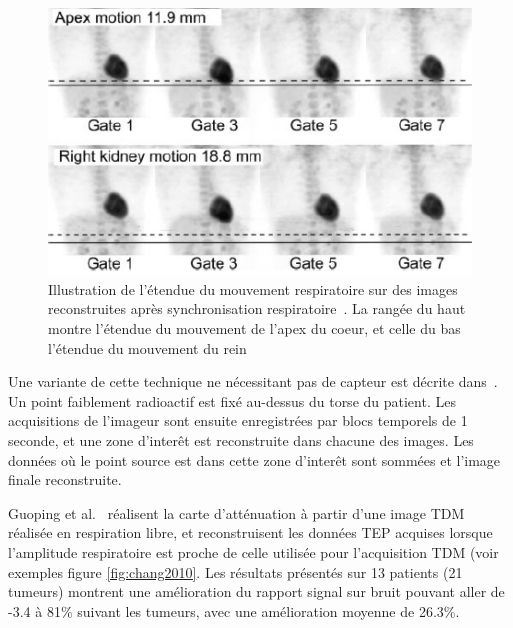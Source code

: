 \begin{figure}[h!]
	\begin{center}
		\includegraphics[width=12cm]{images/gatingBoucher2004}
	\end{center}
	\caption{Illustration de l'étendue du mouvement respiratoire sur des images reconstruites après synchronisation respiratoire~\cite{boucher2004respiratory}. La rangée du haut montre l'étendue du mouvement de l'apex du coeur, et celle du bas l'étendue du mouvement du rein} 
	\label{fig:boucher2004}
\end{figure}

Une variante de cette technique ne nécessitant pas de capteur est décrite dans~\cite{nehmeh2003reduction}. Un point faiblement radioactif est fixé au-dessus du torse du patient. Les acquisitions de l'imageur sont ensuite enregistrées par blocs temporels de 1 seconde, et une zone d'interêt est reconstruite dans chacune des images. Les données où le point source est dans cette zone d'interêt sont sommées et l'image finale reconstruite.

Guoping et al.~\cite{GuopingChang2010Implementation} réalisent la carte d'atténuation à partir d'une image TDM réalisée en respiration libre, et reconstruisent les données TEP acquises lorsque l'amplitude respiratoire est proche de celle utilisée pour l'acquisition TDM (voir exemples figure \ref{fig:chang2010}. Les résultats présentés sur 13 patients (21 tumeurs) montrent une amélioration du rapport signal sur bruit pouvant aller de -3.4 à 81\% suivant les tumeurs, avec une amélioration moyenne de 26.3\%.

